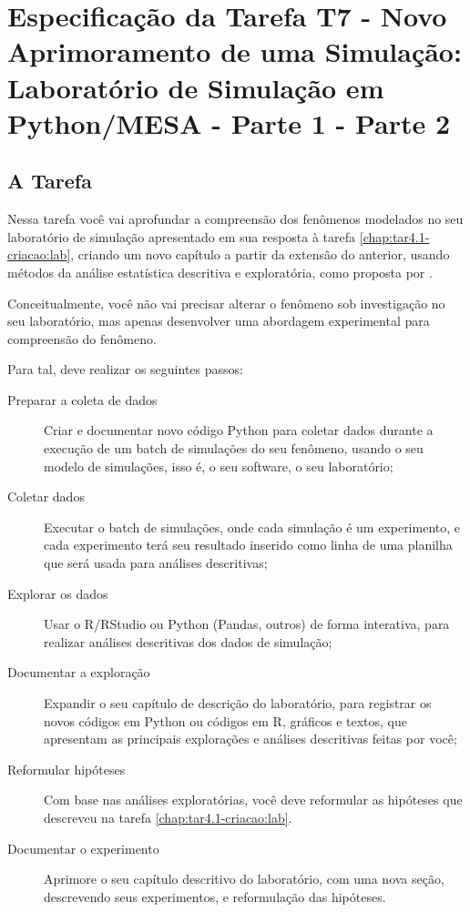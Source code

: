 \chapter{Especificação da Tarefa T7 - Novo Aprimoramento de uma Simulação: Laboratório de Simulação em Python/MESA - Parte 1 - Parte 2\label{chap:tar4.2-analise}}

\section{A Tarefa} 

Nessa tarefa você vai aprofundar a compreensão dos fenômenos modelados no seu laboratório de simulação apresentado em sua resposta à tarefa \ref{chap:tar4.1-criacao:lab}, criando um novo capítulo a partir da extensão do anterior,
usando métodos da análise estatística descritiva e exploratória, como proposta por \citet{wickham_r_2016}.

Conceitualmente, você não vai precisar alterar o fenômeno sob investigação no seu laboratório, mas apenas desenvolver uma abordagem experimental para compreensão do fenômeno. 

Para tal, deve realizar os seguintes passos:
\begin{description}
    \item [Preparar a coleta de dados] Criar e documentar novo código Python para coletar dados durante a execução de um batch de simulações do seu fenômeno, usando o seu modelo de simulações, isso é, o seu software, o seu laboratório;
    \item [Coletar dados] Executar o batch de simulações, onde cada simulação é um experimento, e cada experimento terá seu resultado inserido como linha de uma planilha que será usada para análises descritivas;
    \item [Explorar os dados] Usar o R/RStudio ou Python (Pandas, outros) de forma interativa, para realizar análises descritivas dos dados de simulação;
    \item [Documentar a exploração] Expandir o seu capítulo de descrição do laboratório, para registrar os novos códigos em Python ou códigos em R, gráficos e textos, que apresentam as principais explorações e análises descritivas feitas por você;
    \item [Reformular hipóteses] Com base nas análises exploratórias, você deve reformular as hipóteses que descreveu na tarefa \ref{chap:tar4.1-criacao:lab}.
    \item [Documentar o experimento] Aprimore o seu capítulo descritivo do laboratório, com uma nova seção, descrevendo seus experimentos, e reformulação das hipóteses.
\end{description}

